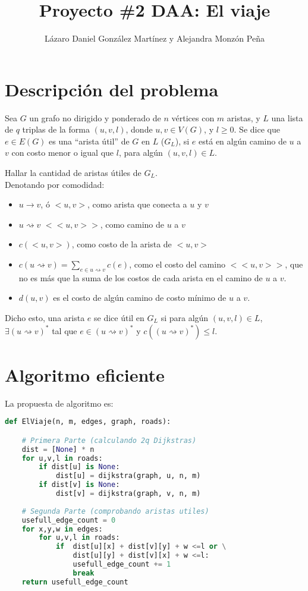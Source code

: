 \documentclass[a4paper]{article}
\begin{document}
    \title{\textbf{Proyecto \#2 DAA:} El viaje}
    \author{L\'azaro Daniel Gonz\'alez Mart\'inez y Alejandra Monz\'on Pe\~na}
    \date{}
    \maketitle

    \section*{Descripci\'on del problema}
    Sea $G$ un grafo no dirigido y ponderado de $n$ vértices con $m$ aristas, y $L$ una lista de $q$ triplas de la forma $(u,v,l)$, donde $u,v\in V(G)$, y $l \ge 0$. Se dice que $e \in E(G)$ es una ``arista útil'' de $G$ en $L$ ($G_L$), si $e$ está en algún camino de $u$ a $v$ con costo menor o igual que $l$, para algún $(u,v,l)\in L$.
    
    Hallar la cantidad de aristas útiles de $G_L$.\\
    
    Denotando por comodidad:
    \begin{itemize}
    	\item $u \rightarrow v$, ó $<u,v>$, como arista que conecta a $u$ y $v$
    	\item $u \rightsquigarrow v$ $<<u, v>>$, como camino de $u$ a $v$
    	\item $c(<u,v>)$, como costo de la arista de $<u,v>$
    	\item $c(u \rightsquigarrow v) = \sum_{e\in u \rightsquigarrow v}^{}c(e)$, como el costo del camino $<<u,v>>$, que no es más que la suma de los costos de cada arista en el camino de $u$ a $v$.
    	\item $d(u,v)$ es el costo de algún camino de costo mínimo de $u$ a $v$.
    \end{itemize}
	
	Dicho esto, una arista $e$ se dice útil en $G_L$ si para algún $(u,v,l) \in L$, $\exists (u\rightsquigarrow v)^*$ tal que $e \in (u\rightsquigarrow v)^*$ y $c((u\rightsquigarrow v)^*) \le l$.
    
    
    \section*{Algoritmo eficiente}
    
    La propuesta de algoritmo es:
    
    \begin{lstlisting}[language=Python]
def ElViaje(n, m, edges, graph, roads):

    # Primera Parte (calculando 2q Dijkstras)
    dist = [None] * n
    for u,v,l in roads:
        if dist[u] is None:
            dist[u] = dijkstra(graph, u, n, m)
        if dist[v] is None:
            dist[v] = dijkstra(graph, v, n, m)
    
    # Segunda Parte (comprobando aristas utiles)
    usefull_edge_count = 0     
    for x,y,w in edges:
        for u,v,l in roads:
            if  dist[u][x] + dist[v][y] + w <=l or \
                dist[u][y] + dist[v][x] + w <=l:
                usefull_edge_count += 1
                break
    return usefull_edge_count
    \end{lstlisting}
    
\end{document}
